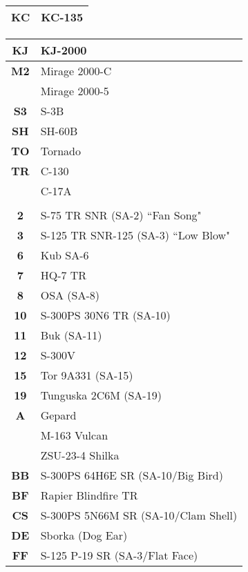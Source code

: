 \documentclass[8pt,usenames,dvipsnames,twoside]{article}
\begin{document}
\begin{multicols*}{2}
\begin{center}
\begin{tabular}{c | p{4cm}}
				\midrule
				\textbf{KC} & KC-135 \\
				\midrule
			\end{tabular}
		\end{center}
		\begin{center}
			\begin{tabular}{c | p{4cm}}
				\textbf{KJ} & KJ-2000 \\
				\midrule
				\textbf{M2} & Mirage 2000-C \\
				& Mirage 2000-5 \\
				\midrule
				\textbf{S3} & S-3B \\
				\midrule
				\textbf{SH} & SH-60B \\
				\midrule
				\textbf{TO} & Tornado \\
				\midrule
				\textbf{TR} & C-130 \\
				& C-17A \\
				\toprule
				\multicolumn{2}{c}{\blue{AIR DEFENSE}} \\
				\toprule
				\textbf{2} & S-75 TR SNR (SA-2) ``Fan Song" \\
				\midrule
				\textbf{3} & S-125 TR SNR-125 (SA-3) ``Low Blow" \\
				\midrule
				\textbf{6} & Kub SA-6 \\
				\midrule
				\textbf{7} & HQ-7 TR \\
				\midrule
				\textbf{8} & OSA (SA-8) \\
				\midrule
				\textbf{10} & S-300PS 30N6 TR (SA-10) \\
				\midrule
				\textbf{11} & Buk (SA-11) \\
				\midrule
				\textbf{12} & S-300V \\
				\midrule
				\textbf{15} & Tor 9A331 (SA-15) \\
				\midrule
				\textbf{19} & Tunguska 2C6M (SA-19) \\
				\midrule
				\textbf{A} & Gepard \\
				& M-163 Vulcan \\
				& ZSU-23-4 Shilka \\
				\midrule
				\textbf{BB} & S-300PS 64H6E SR (SA-10/Big Bird) \\
				\midrule
				\textbf{BF} & Rapier Blindfire TR \\
				\midrule
				\textbf{CS} & S-300PS 5N66M SR (SA-10/Clam Shell) \\
				\midrule
				\textbf{DE} & Sborka (Dog Ear) \\
				\midrule
				\textbf{FF} & S-125 P-19 SR (SA-3/Flat Face) \\

\end{tabular}
\end{center}
\end{multicols*}
\end{document}
